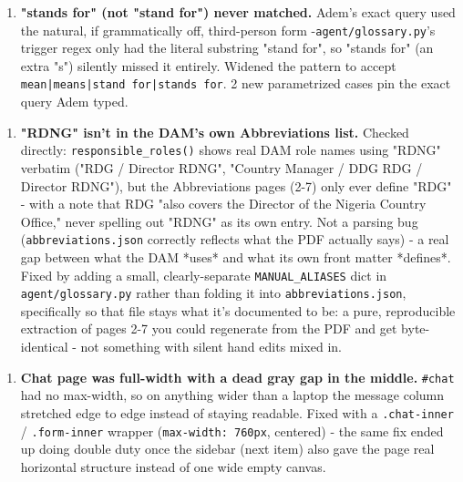 \begin{enumerate}
\item \textbf{"stands for" (not "stand for") never matched.} Adem's exact query used the natural, if grammatically off, third-person form -\texttt{agent/\allowbreak{}glossary.py}'s trigger regex only had the literal substring "stand for", so "stands for" (an extra "s") silently missed it entirely. Widened the pattern to accept \texttt{mean|means|stand for|stands for}. 2 new parametrized cases pin the exact query Adem typed.
\end{enumerate}
\begin{enumerate}
\item \textbf{"RDNG" isn't in the DAM's own Abbreviations list.} Checked directly: \texttt{responsible\_\allowbreak{}roles()} shows real DAM role names using "RDNG" verbatim ("RDG / Director RDNG", "Country Manager / DDG RDG / Director RDNG"), but the Abbreviations pages (2-7) only ever define "RDG" - with a note that RDG "also covers the Director of the Nigeria Country Office," never spelling out "RDNG" as its own entry. Not a parsing bug (\texttt{abbreviations.json} correctly reflects what the PDF actually says) - a real gap between what the DAM *uses* and what its own front matter *defines*. Fixed by adding a small, clearly-separate \texttt{MANUAL\_\allowbreak{}ALIASES} dict in \texttt{agent/\allowbreak{}glossary.py} rather than folding it into \texttt{abbreviations.json}, specifically so that file stays what it's documented to be: a pure, reproducible extraction of pages 2-7 you could regenerate from the PDF and get byte-identical - not something with silent hand edits mixed in.
\end{enumerate}
\begin{enumerate}
\item \textbf{Chat page was full-width with a dead gray gap in the middle.} \texttt{\#chat} had no max-width, so on anything wider than a laptop the message column stretched edge to edge instead of staying readable. Fixed with a \texttt{.chat-inner} / \texttt{.form-inner} wrapper (\texttt{max-width: 760px}, centered) - the same fix ended up doing double duty once the sidebar (next item) also gave the page real horizontal structure instead of one wide empty canvas.
\end{enumerate}
